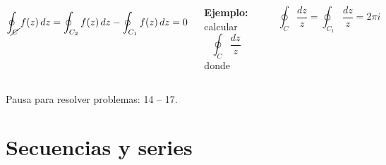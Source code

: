 \documentclass[9pt, aspectratio=169]{beamer}
\begin{document}
\begin{frame}
\begin{columns}[t]
		\cx
		\[\oint_{\cancel{C}} f(z) \, dz = \oint_{C_2} f(z) \, dz - \oint_{C_1} f(z) \, dz = 0 \]
		\pause

		\textbf{Ejemplo:} calcular
		\[ \oint_C \frac{dz}{z} \]
		donde
		\begin{center}
			\includegraphics[scale=0.40]{figs/fig-10.pdf}
		\end{center}

		\[ \oint_C \frac{dz}{z} = \oint_{C_1} \frac{dz}{z} = 2 \pi i \]

	\end{columns}
\end{frame}


\begin{frame}[standout]
	Pausa para resolver problemas: 14 -- 17.
\end{frame}

\section{Secuencias y series}
\end{document}
